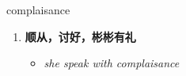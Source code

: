 
\begin{frame}
{\huge complaisance}
\begin{center}
\begin{enumerate}\Large
  \item \textbf{顺从，讨好，彬彬有礼}
  \begin{itemize}
    \item \em{\Large{she speak with complaisance}}
  \end{itemize}
\end{enumerate}
\end{center}
\end{frame}
